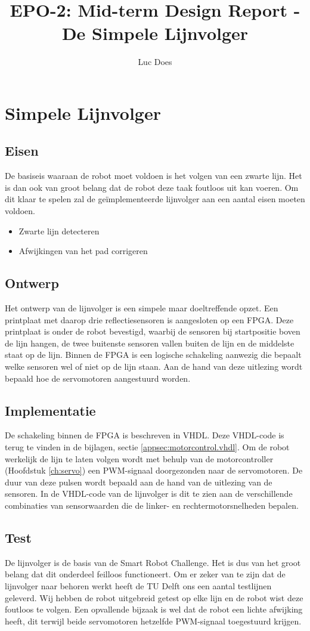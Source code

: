 \documentclass{report}
\title{EPO-2: Mid-term Design Report - De Simpele Lijnvolger}
\author{Luc Does}
\begin{document}
\chapter{Simpele Lijnvolger}
\label{ch:lijnvolger}

\section{Eisen}
De basiseis waaraan de robot moet voldoen is het volgen van een zwarte lijn.
Het is dan ook van groot belang dat de robot deze taak foutloos uit kan voeren.
Om dit klaar te spelen zal de geïmplementeerde lijnvolger aan een aantal eisen moeten voldoen.

\begin{itemize}
\item Zwarte lijn detecteren
\item Afwijkingen van het pad corrigeren
\end{itemize}

\section{Ontwerp}
Het ontwerp van de lijnvolger is een simpele maar doeltreffende opzet.
Een printplaat met daarop drie reflectiesensoren is aangesloten op een FPGA.
Deze printplaat is onder de robot bevestigd, waarbij de sensoren bij startpositie boven de lijn hangen, de twee buitenste sensoren vallen buiten de lijn en de middelste staat op de lijn.
Binnen de FPGA is een logische schakeling aanwezig die bepaalt welke sensoren wel of niet op de lijn staan.
Aan de hand van deze uitlezing wordt bepaald hoe de servomotoren aangestuurd worden.

\section{Implementatie}
De schakeling binnen de FPGA is beschreven in VHDL.
Deze VHDL-code is terug te vinden in de bijlagen, sectie \ref{appsec:motorcontrol.vhdl}.
Om de robot werkelijk de lijn te laten volgen wordt met behulp van de motorcontroller (Hoofdstuk \ref{ch:servo}) een PWM-signaal doorgezonden naar de servomotoren.
De duur van deze pulsen wordt bepaald aan de hand van de uitlezing van de sensoren.
In de VHDL-code van de lijnvolger is dit te zien aan de verschillende combinaties van sensorwaarden die de linker- en rechtermotorsnelheden bepalen.

\section{Test}
De lijnvolger is de basis van de Smart Robot Challenge.
Het is dus van het groot belang dat dit onderdeel feilloos functioneert.
Om er zeker van te zijn dat de lijnvolger naar behoren werkt heeft de TU Delft ons een aantal testlijnen geleverd.
Wij hebben de robot uitgebreid getest op elke lijn en de robot wist deze foutloos te volgen.
Een opvallende bijzaak is wel dat de robot een lichte afwijking heeft, dit terwijl beide servomotoren hetzelfde PWM-signaal toegestuurd krijgen.
\end{document}
